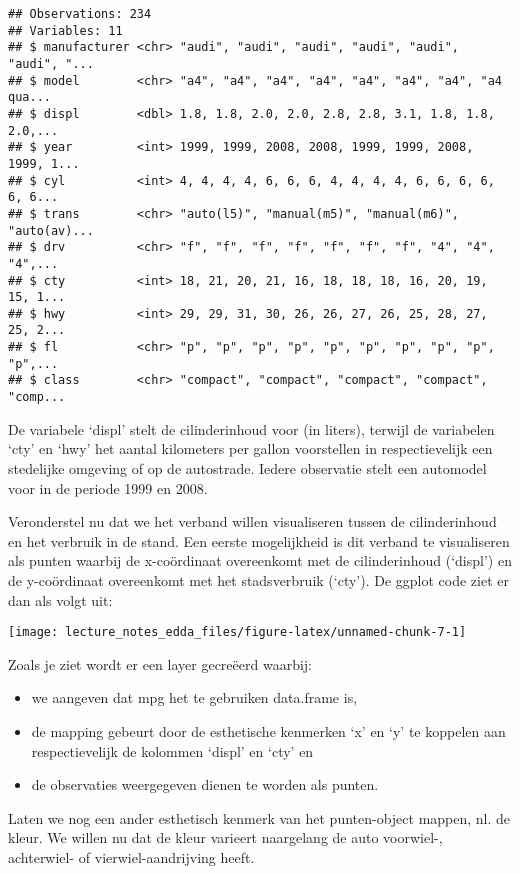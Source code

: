 \documentclass[]{memoir}
\providecommand{\tightlist}{%
  \setlength{\itemsep}{0pt}\setlength{\parskip}{0pt}}
\begin{document}
\begin{verbatim}
## Observations: 234
## Variables: 11
## $ manufacturer <chr> "audi", "audi", "audi", "audi", "audi", "audi", "...
## $ model        <chr> "a4", "a4", "a4", "a4", "a4", "a4", "a4", "a4 qua...
## $ displ        <dbl> 1.8, 1.8, 2.0, 2.0, 2.8, 2.8, 3.1, 1.8, 1.8, 2.0,...
## $ year         <int> 1999, 1999, 2008, 2008, 1999, 1999, 2008, 1999, 1...
## $ cyl          <int> 4, 4, 4, 4, 6, 6, 6, 4, 4, 4, 4, 6, 6, 6, 6, 6, 6...
## $ trans        <chr> "auto(l5)", "manual(m5)", "manual(m6)", "auto(av)...
## $ drv          <chr> "f", "f", "f", "f", "f", "f", "f", "4", "4", "4",...
## $ cty          <int> 18, 21, 20, 21, 16, 18, 18, 18, 16, 20, 19, 15, 1...
## $ hwy          <int> 29, 29, 31, 30, 26, 26, 27, 26, 25, 28, 27, 25, 2...
## $ fl           <chr> "p", "p", "p", "p", "p", "p", "p", "p", "p", "p",...
## $ class        <chr> "compact", "compact", "compact", "compact", "comp...
\end{verbatim}

De variabele `displ' stelt de cilinderinhoud voor (in liters), terwijl de variabelen `cty' en `hwy' het aantal kilometers per gallon voorstellen in respectievelijk een stedelijke omgeving of op de autostrade. Iedere observatie stelt een automodel voor in de periode 1999 en 2008.

Veronderstel nu dat we het verband willen visualiseren tussen de cilinderinhoud en het verbruik in de stand. Een eerste mogelijkheid is dit verband te visualiseren als punten waarbij de x-coördinaat overeenkomt met de cilinderinhoud (`displ') en de y-coördinaat overeenkomt met het stadsverbruik (`cty'). De ggplot code ziet er dan als volgt uit:

\texttt{[image: lecture\_notes\_edda\_files/figure-latex/unnamed-chunk-7-1]}

Zoals je ziet wordt er een layer gecreëerd waarbij:

\begin{itemize}
\tightlist
\item
  we aangeven dat mpg het te gebruiken data.frame is,
\item
  de mapping gebeurt door de esthetische kenmerken `x' en `y' te koppelen aan respectievelijk de kolommen `displ' en `cty' en
\item
  de observaties weergegeven dienen te worden als punten.
\end{itemize}

Laten we nog een ander esthetisch kenmerk van het punten-object mappen, nl. de kleur. We willen nu dat de kleur varieert naargelang de auto voorwiel-, achterwiel- of vierwiel-aandrijving heeft.
\end{document}
